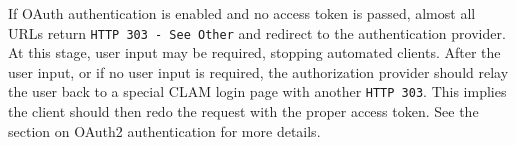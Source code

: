 \documentclass[a4paper,12pt,twoside,openright]{report}
\newenvironment{devnotes}
{\newpage
\begin{center}
    \begin{tabular}[h!]{|p{0.8\textwidth}|}
    \hline
    {\bf Development Notes}\\\hline}
{   \\\hline
    \end{tabular}
\end{center}}
\begin{document}
If OAuth authentication is enabled and no access token is passed, almost all URLs
return \texttt{HTTP 303 - See Other} and redirect to the authentication
provider. At this stage, user input may be required, stopping automated
clients. After the user input, or if no user input is required, the
authorization provider should relay the user back to a special CLAM login page with another
\texttt{HTTP 303}. This implies the client should then redo the request with
the proper access token. See the section on OAuth2 authentication for more details.






\end{document}
